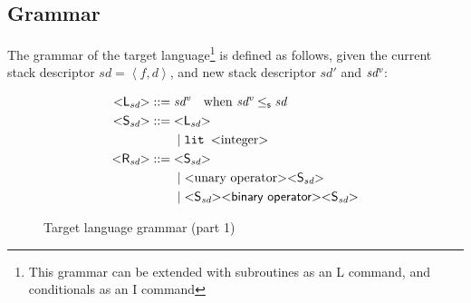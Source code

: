 \documentclass[12pt,a4paper]{report}
\theoremstyle{definition}
\newcommand{\bracket}[1]{\mathord{<} #1 \mathord{>}}
\newcommand{\ang}[1]{\left\langle #1 \right\rangle}
\begin{document}
    \subsection{Grammar} \label{subsec: grammar}
    The grammar of the target language\footnote{This grammar can be extended with subroutines as an \textsf{L} command, and conditionals as an \textsf{I} command} is defined as follows, given the current stack descriptor $\textit{sd} = \ang{f, d}$, and new stack descriptor $\textit{sd′}$ and $\textit{sd\textsuperscript{v}}$:
    \begin{figure}[H]
        \centering
        \[\begin{aligned}
            \bracket{\textsf{L}_{\textit{sd}}} ::={}& \textit{sd\textsuperscript{v}} \quad \text{when } \textit{sd\textsuperscript{v}} \leq_\mathsf{s} \textit{sd} \\
            \bracket{\textsf{S}_{\textit{sd}}} ::={}& \bracket{\textsf{L}_{\textit{sd}}} \\
                            &\mid \texttt{lit } \bracket{\text{integer}} \\
            \bracket{\textsf{R}_{\textit{sd}}} ::={}& \bracket{\textsf{S}_{\textit{sd}}} \\
                            &\mid \bracket{ \text{unary operator} } \bracket{ \textsf{S}_{\textit{sd}}}\\
                            &\mid \bracket{\textsf{S}_{\textit{sd}}} \bracket{\textsf{binary operator}} \bracket{ \textsf{S}_{\textit{sd}} }
        \end{aligned}\]
        \caption{Target language grammar (part 1)}
        \label{fig: target_grammar_1}
    \end{figure}
\end{document}
